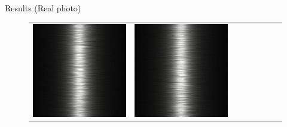\documentclass[final]{beamer}
\newlength{\twocolwid}
\newlength{\resultwidth}
\begin{document}
\begin{frame}[t]
\begin{columns}[t]
\begin{column}{\twocolwid}
\begin{block}{Results (Real photo)}
\begin{figure}[t]
\begin{tabular}{ccrclccc}
            		\includegraphics[width=\resultwidth]{images/real/metal/good2.jpg} &
            		\includegraphics[width=\resultwidth]{images/real/metal/good3.jpg} &

\end{tabular}
\end{figure}
\end{block}
\end{column}
\end{columns}
\end{frame}
\end{document}
